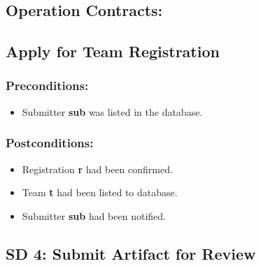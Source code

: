 \subsection*{Operation Contracts:}
\subsection*{Apply for Team Registration}

\subsubsection*{Preconditions:}
\begin{itemize}
\itemsep-1.5em 
    \item Submitter \textbf{sub} was listed in the database.
   
\end{itemize}



\subsubsection*{Postconditions:}
\begin{itemize}
\itemsep-1.5em 
    \item Registration \textbf{r} had been confirmed.
    \item Team \textbf{t} had been listed to database.
    \item Submitter \textbf{sub} had been notified.
\end{itemize}

\newpage








\subsection*{SD 4: Submit Artifact for Review}

